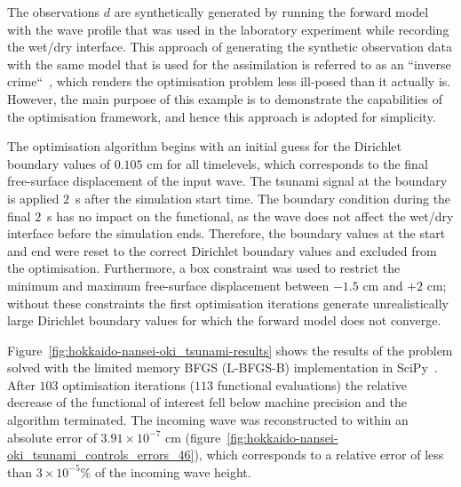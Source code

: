 \documentclass[prodmode,acmtoms]{acmsmall}
\begin{document}
The observations $d$ are synthetically generated by running the forward model with the wave profile that was used in the laboratory experiment while recording the wet/dry interface. 
This approach of generating the synthetic observation data with the same model that is used for the assimilation is referred to as an ``inverse crime``~\cite{kaipo2005}, 
which renders the optimisation problem less ill-posed than it actually is. 
However, the main purpose of this example is to demonstrate the capabilities of the optimisation framework, and hence this approach is adopted for simplicity.

The optimisation algorithm begins with an initial guess for the Dirichlet boundary values of $0.105$ cm for all timelevels, which corresponds to the final free-surface displacement of the input wave.
The tsunami signal at the boundary is applied $2$~s after the simulation start time.
The boundary condition during the final $2$~s has no impact on the functional,
as the wave does not affect the wet/dry interface before the simulation ends. 
Therefore, the boundary values at the start and end were reset to the correct Dirichlet boundary values and excluded from the optimisation.
Furthermore, a box constraint was used to restrict the minimum and maximum free-surface displacement between $-1.5$ cm and $+2$ cm; 
without these constraints the first optimisation iterations generate unrealistically large Dirichlet boundary values for which the forward model does not converge.

Figure~\ref{fig:hokkaido-nansei-oki_tsunami-results} shows the results of the problem solved with the limited memory BFGS (L-BFGS-B) implementation in SciPy~\cite{scipy}.
After $103$ optimisation iterations ($113$ functional evaluations) the relative decrease of the functional of interest fell below machine precision and the algorithm terminated. 
The incoming wave was reconstructed to within an absolute error of $3.91 \times 10^{-7}$ cm (figure~\ref{fig:hokkaido-nansei-oki_tsunami_controls_errors_46}),
which corresponds to a relative error of less than $3\times10^{-5}$\% of the incoming wave height.
\end{document}
